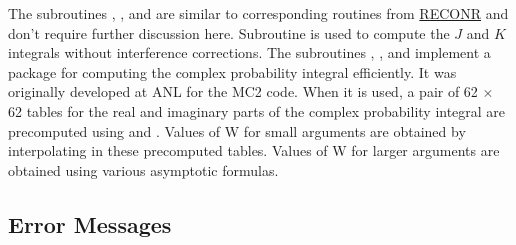 The subroutines ,
, and
are similar to corresponding routines
from \hyperlink{sRECONRhy}{RECONR}
and don't require further discussion here.  Subroutine
 is used to compute
the $J$ and $K$ integrals without interference corrections.
The subroutines ,
, and
 implement a package for computing
the complex probability integral efficiently. It was originally
developed at ANL for the
MC2 code.
When it is used, a pair of 62 $\times$ 62 tables for the real and
imaginary parts of the complex probability integral
 are precomputed using
 and .  Values of W for small arguments
are obtained by interpolating in these precomputed tables.
Values of W for larger arguments are obtained using various
asymptotic formulas.

\subsection{Error Messages}
\label{ssUNRESR_msg}

